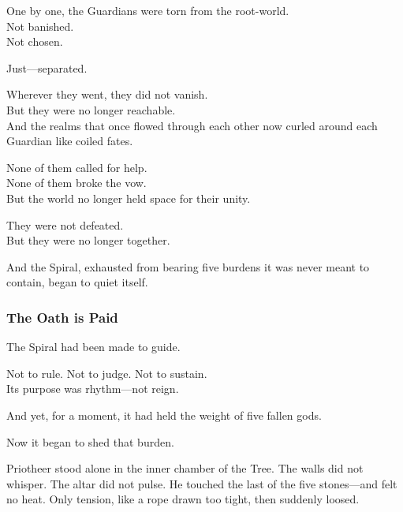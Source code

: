 \documentclass[12pt]{article}
\begin{document}
\vspace{0.5em}
One by one, the Guardians were torn from the root-world.\\
Not banished.\\
Not chosen.

\vspace{0.5em}
Just---separated.

\vspace{0.5em}
Wherever they went, they did not vanish.\\
But they were no longer reachable.\\
And the realms that once flowed through each other now curled around each Guardian like coiled fates.

\vspace{0.5em}
None of them called for help.\\
None of them broke the vow.\\
But the world no longer held space for their unity.

\vspace{0.5em}
They were not defeated.\\
But they were no longer together.

\vspace{0.5em}
And the Spiral, exhausted from bearing five burdens it was never meant to contain, began to quiet itself.

\dotfill

\subsubsection*{The Oath is Paid}

The Spiral had been made to guide.

\vspace{0.5em}
Not to rule. Not to judge. Not to sustain.\\
Its purpose was rhythm---not reign.

\vspace{0.5em}
And yet, for a moment, it had held the weight of five fallen gods.

\vspace{0.5em}
Now it began to shed that burden.

\vspace{0.5em}
Priotheer stood alone in the inner chamber of the Tree. The walls did not whisper. The altar did not pulse. He touched the last of the five stones---and felt no heat. Only tension, like a rope drawn too tight, then suddenly loosed.
\end{document}
